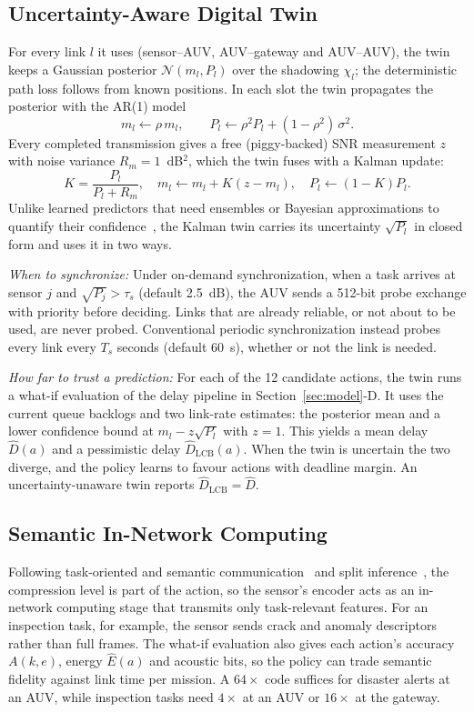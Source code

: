 \documentclass[lettersize,journal]{IEEEtran}
\begin{document}
\subsection{Uncertainty-Aware Digital Twin}
For every link $l$ it uses (sensor--AUV, AUV--gateway and AUV--AUV), the twin keeps a Gaussian posterior $\mathcal{N}(m_l,P_l)$ over the shadowing $\chi_l$; the deterministic path loss follows from known positions. In each slot the twin propagates the posterior with the AR(1) model
\begin{equation}
m_l \leftarrow \rho\, m_l,\qquad P_l \leftarrow \rho^2 P_l + (1-\rho^2)\,\sigma^2 .
\end{equation}
Every completed transmission gives a free (piggy-backed) SNR measurement $z$ with noise variance $R_m=1$~dB$^2$, which the twin fuses with a Kalman update:
\begin{equation}
K = \frac{P_l}{P_l + R_m},\quad m_l \leftarrow m_l + K (z - m_l),\quad P_l \leftarrow (1-K) P_l .
\end{equation}
Unlike learned predictors that need ensembles or Bayesian approximations to quantify their confidence~\cite{lakshminarayanan2017ensembles}, the Kalman twin carries its uncertainty $\sqrt{P_l}$ in closed form and uses it in two ways.

\emph{When to synchronize:} Under on-demand synchronization, when a task arrives at sensor $j$ and $\sqrt{P_j}>\tau_s$ (default 2.5~dB), the AUV sends a 512-bit probe exchange with priority before deciding. Links that are already reliable, or not about to be used, are never probed. Conventional periodic synchronization instead probes every link every $T_s$ seconds (default 60~s), whether or not the link is needed.

\emph{How far to trust a prediction:} For each of the 12 candidate actions, the twin runs a what-if evaluation of the delay pipeline in Section~\ref{sec:model}-D. It uses the current queue backlogs and two link-rate estimates: the posterior mean and a lower confidence bound at $m_l - z\sqrt{P_l}$ with $z=1$. This yields a mean delay $\hat D(a)$ and a pessimistic delay $\hat D_{\mathrm{LCB}}(a)$. When the twin is uncertain the two diverge, and the policy learns to favour actions with deadline margin. An uncertainty-unaware twin reports $\hat D_{\mathrm{LCB}}=\hat D$.

\subsection{Semantic In-Network Computing}
Following task-oriented and semantic communication~\cite{shao2022taskoriented,xie2021deepsc} and split inference~\cite{kang2017neurosurgeon}, the compression level is part of the action, so the sensor's encoder acts as an in-network computing stage that transmits only task-relevant features. For an inspection task, for example, the sensor sends crack and anomaly descriptors rather than full frames. The what-if evaluation also gives each action's accuracy $A(k,e)$, energy $\hat E(a)$ and acoustic bits, so the policy can trade semantic fidelity against link time per mission. A $64\times$ code suffices for disaster alerts at an AUV, while inspection tasks need $4\times$ at an AUV or $16\times$ at the gateway.
\end{document}

